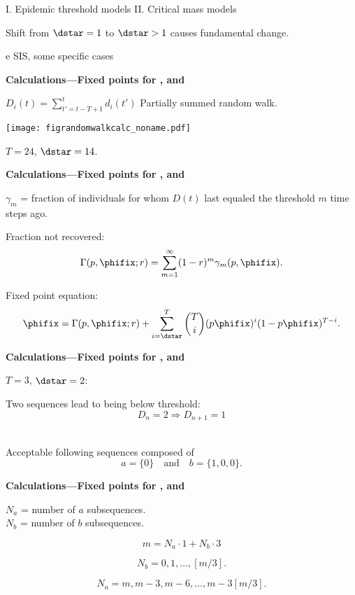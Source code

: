  \qquad I. Epidemic threshold models \hfill
  II. Critical mass models

   Shift from $\dstar=1$ to $\dstar>1$ causes fundamental change.



e   SIS, some specific cases


  \textbf{Calculations---Fixed points for , and }

  $D_i(t) = \sum_{t'=t-T+1}^{t} d_i(t')$ \hfill 
  Partially summed random walk.

  \centering
  \texttt{[image: figrandomwalkcalc\_noname.pdf]}
  
  $T=24$, $\dstar=14$.

  \textbf{Calculations---Fixed points for , and }

  $\gamma_m$ = fraction of individuals for whom $D(t)$ last equaled the threshold $m$ time steps ago.

  Fraction not recovered:
  $$
  \Gamma(p,\phifix;r) = \sum_{m=1}^{\infty} (1-r)^m \gamma_m(p,\phifix).
  $$

  Fixed point equation:
$$
  \phifix = \Gamma(p,\phifix;r) 
  + \sum_{i=\dstar}^{T}
  \binom{T}{i}
  (p\phifix)^{i} (1 - p\phifix)^{T-i}.
$$



  \textbf{Calculations---Fixed points for , and }

$T=3$, $\dstar=2$:

Two sequences lead to being below threshold:
$$D_n=2 \Rightarrow D_{n+1}=1$$
 \hfill  \\

  Acceptable following sequences composed of
  $$ a=\{0\} \quad \mbox{and} \quad b=\{1,0,0\}. $$

  \textbf{Calculations---Fixed points for , and }

  $N_a$ = number of $a$ subsequences.\\
  $N_b$ = number of $b$ subsequences.

  $$
  m = N_a \cdot 1 + N_b \cdot 3
  $$

  $$
  N_b = 0, 1, \ldots, [m/3].
  $$

  $$
  N_a = m, m-3, m-6, \ldots, m-3[m/3].
  $$


